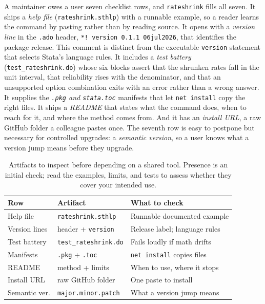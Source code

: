 \documentclass[
    a4paper,
    fontsize=10pt,
    twoside=true,
    numbers=noenddot,
]{kaobook}
\begin{document}
A maintainer owes a user seven checklist rows, and \texttt{rateshrink} fills all seven. It ships a \emph{help file} (\texttt{rateshrink.sthlp}) with a runnable example, so a reader learns the command by pasting rather than by reading source. It opens with a \emph{version line} in the \texttt{.ado} header, \texttt{*! version 0.1.1  06jul2026}, that identifies the package release. This comment is distinct from the executable \texttt{version} statement that selects Stata's language rules. It includes a \emph{test battery} (\texttt{test\_rateshrink.do}) whose six blocks assert that the shrunken rates fall in the unit interval, that reliability rises with the denominator, and that an unsupported option combination exits with an error rather than a wrong answer. It supplies the \emph{\texttt{.pkg} and \texttt{stata.toc}} manifests that let \texttt{net install} copy the right files. It ships a \emph{README} that states what the command does, when to reach for it, and where the method comes from. And it has an \emph{install URL}, a raw GitHub folder a colleague pastes once. The seventh row is easy to postpone but necessary for controlled upgrades: a \emph{semantic version}, so a user knows what a version jump means before they upgrade.

\begin{table}[htbp]
\centering
\caption[The seven-row tool-hardening checklist]{Artifacts to inspect before depending on a shared tool. Presence is an initial check; read the examples, limits, and tests to assess whether they cover your intended use.}
\label{tab:ch15-viz-checklist}
\begin{tabular}{lll}
\hline
Row & Artifact & What to check \\
\hline
Help file     & \texttt{rateshrink.sthlp}     & Runnable documented example \\
Version lines & header + \texttt{version} & Release label; language rules \\
Test battery  & \texttt{test\_rateshrink.do}  & Fails loudly if math drifts \\
Manifests     & \texttt{.pkg} + \texttt{.toc} & \texttt{net install} copies files \\
README        & method + limits              & When to use, where it stops \\
Install URL   & raw GitHub folder            & One paste to install \\
Semantic ver. & \texttt{major.minor.patch}    & What a version jump means \\
\hline
\end{tabular}
\end{table}
\end{document}
